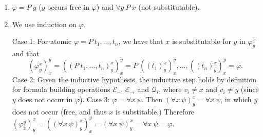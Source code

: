 \begin{enumerate}[label=(\alph*)]
  \item $\varphi=P\ y$ ($y$ occurs free in $\varphi$) and $\forall y\ P\ x$ (not substitutable).
  \item
        We use induction on $\varphi$.

        Case 1: For atomic $\varphi=P\ t_1,\dots,t_n$, we have that $x$ is substitutable for $y$ in $\varphi_y^x$ and that
        \[
          (\varphi_y^x)_x^y = ((P\ t_1,\dots,t_n)_y^x)_x^y = P\ ((t_1)_y^x)_x^y,\dots,((t_n)_y^x)_x^y=\varphi.
        \]
        Case 2: Given the inductive hypothesis, the inductive step holds by definition for formula building operations $\mathcal{E}_{\neg}$, $\mathcal{E}_{\rightarrow}$ and $\mathcal{Q}_i$, where $v_i\neq x$ and $v_i\neq y$ (since $y$ does not occur in $\varphi$).\newline
        Case 3: $\varphi=\forall x\ \psi$. Then $(\forall x\ \psi)_y^x=\forall x\ \psi$, in which $y$ does not occur (free, and thus $x$ is substitable.) Therefore $(\varphi_x^y)_y^x=((\forall x\ \psi)_y^x)_x^y=(\forall x\ \psi)_y^x=\forall x\ \psi=\varphi$.
\end{enumerate}
